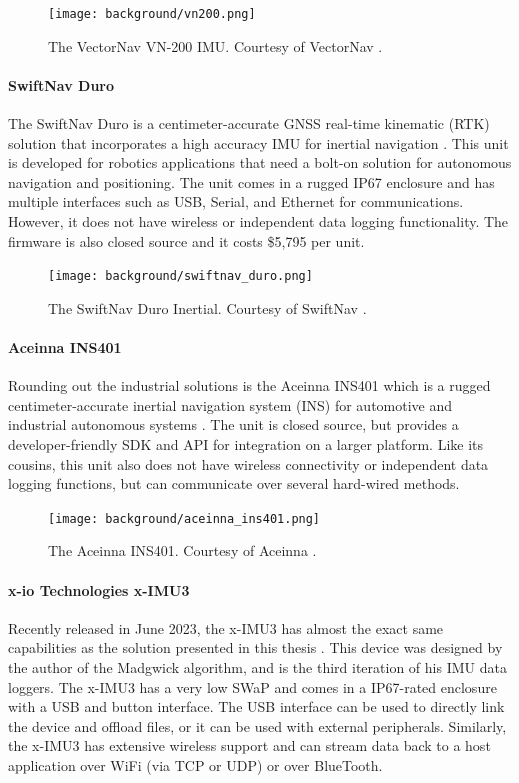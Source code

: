 \begin{figure}
    \centering
    \caption[VectorNav VN-200]{The VectorNav VN-200 IMU.
    Courtesy of VectorNav \cite{VectorNav:VN200}.}
    \texttt{[image: background/vn200.png]}
\end{figure}

\paragraph*{SwiftNav Duro} The SwiftNav Duro is a centimeter-accurate GNSS real-time kinematic (RTK) solution that incorporates a high accuracy IMU for inertial navigation \cite{SwiftNav}.
This unit is developed for robotics applications that need a bolt-on solution for autonomous navigation and positioning.
The unit comes in a rugged IP67 enclosure and has multiple interfaces such as USB, Serial, and Ethernet for communications.
However, it does not have wireless or independent data logging functionality.
The firmware is also closed source and it costs \$5,795 per unit.

\begin{figure}
    \centering
    \caption[SwiftNav Duro]{The SwiftNav Duro Inertial.
    Courtesy of SwiftNav \cite{SwiftNav}.}
    \texttt{[image: background/swiftnav\_duro.png]}
\end{figure}

\paragraph*{Aceinna INS401} Rounding out the industrial solutions is the Aceinna INS401 which is a rugged centimeter-accurate inertial navigation system (INS) for automotive and industrial autonomous systems \cite{Aceinna}.
The unit is closed source, but provides a developer-friendly SDK and API for integration on a larger platform.
Like its cousins, this unit also does not have wireless connectivity or independent data logging functions, but can communicate over several hard-wired methods.

\begin{figure}
    \centering
    \caption[Aceinna INS401]{The Aceinna INS401.
    Courtesy of Aceinna \cite{Aceinna}.}
    \texttt{[image: background/aceinna\_ins401.png]}
\end{figure}

\paragraph*{x-io Technologies x-IMU3} Recently released in June 2023, the x-IMU3 has almost the exact same capabilities as the solution presented in this thesis \cite{xioTechnologies}.
This device was designed by the author of the Madgwick algorithm, and is the third iteration of his IMU data loggers.
The x-IMU3 has a very low SWaP and comes in a IP67-rated enclosure with a USB and button interface.
The USB interface can be used to directly link the device and offload files, or it can be used with external peripherals.
Similarly, the x-IMU3 has extensive wireless support and can stream data back to a host application over WiFi (via TCP or UDP) or over BlueTooth.


